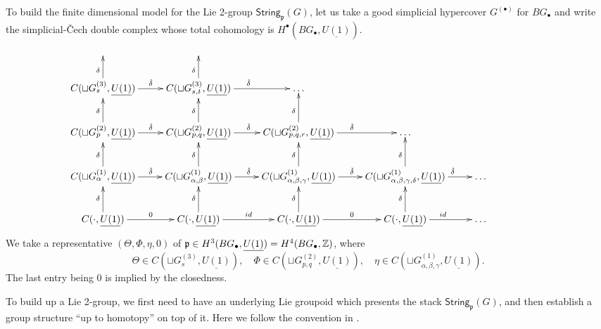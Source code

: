 \documentclass[letterpaper,10pt, oneside]{article} %
\newcommand{\String}{\mathsf{String}}%
\newcommand{\frkp}{\mathfrak p}
\newcommand{\pp}{\frkp} %
\begin{document}
To build the finite dimensional model for the Lie 2-group $\String_\pp(G)$, let us
take a good simplicial hypercover $G^{(\bullet)}$ for $BG_\bullet$ and write the
simplicial-\v{C}ech double complex whose total cohomology is
$H^\bullet (BG_\bullet, \underline{U(1)})$.
\begin{equation}\label{db-cx:BG}
 \xymatrix{
 &&&&&&
\\
 C(\sqcup G^{(3)}_{s},\underline{U(1)})\ar[r]^{\check{\delta}}\ar[u]^{\delta}
 &C(\sqcup G^{(3)}_{s,t},\underline{U(1)})\ar[r]^{\check{\delta}}\ar[u]^{\delta}
 &\dots%
&%
&%
&
 \\
  C(\sqcup G^{(2)}_{p},\underline{U(1)})\ar[r]^{\check{\delta}}\ar[u]^{\delta}
  &C(\sqcup G^{(2)}_{p,q},\underline{U(1)})\ar[r]^{\check{\delta}}\ar[u]^{\delta}
 &C(\sqcup G^{(2)}_{p,q,r},\underline{U(1)})\ar[r]^{\check{\delta}}\ar[u]^{\delta}
&\dots %
& %
&
 \\
 C(\sqcup G^{(1)}_{\alpha},\underline{U(1)})\ar[r]^{\check{\delta}}\ar[u]^{\delta}
 & C(\sqcup G^{(1)}_{\alpha,\beta},\underline{U(1)})\ar[r]^{\check{\delta}}\ar[u]^{\delta}
 &C(\sqcup G^{(1)}_{\alpha,\beta,\gamma},\underline{U(1)})\ar[r]^{\check{\delta}}\ar[u]^{\delta}
&C(\sqcup G^{(1)}_{\alpha,\beta,\gamma,\delta},\underline{U(1)})\ar[r]^{\qquad\check{\delta}}\ar[u]^{\delta}
&\dots %
&
 \\
 C(\cdot,\underline{U(1)})\ar[r]^{0}\ar[u]^{\delta}
 &C(\cdot,\underline{U(1)})\ar[r]^{id} \ar[u]^{\delta}
&C(\cdot,\underline{U(1)})\ar[r]^{0}\ar[u]^{\delta}
&C(\cdot,\underline{U(1)})\ar[r]^{id} \ar[u]^{\delta}
&\dots %
&
}
 \end{equation}
We take a representative $(\Theta, \Phi, \eta, 0)$ of $\pp \in H^3(BG_\bullet, \underline{U(1)})=H^4(BG_\bullet, \Z)$, where $$\Theta\in C(\sqcup
 G^{(3)}_{s},\underline{U(1)}), \quad\Phi\in C(\sqcup G^{(2)}_{p,q},\underline{U(1)}),\quad \eta \in
 C(\sqcup G^{(1)}_{\alpha, \beta, \gamma}, \underline{U(1)}).$$ The last entry being
 0 is implied by the closedness.

To build up a  Lie 2-group, we first need to have an underlying
Lie groupoid which presents the stack $\String_\pp(G)$, and then establish a group structure ``up to homotopy''
on top of it. Here we follow the
convention in \cite[Section 2]{wz:int}.
\end{document}
